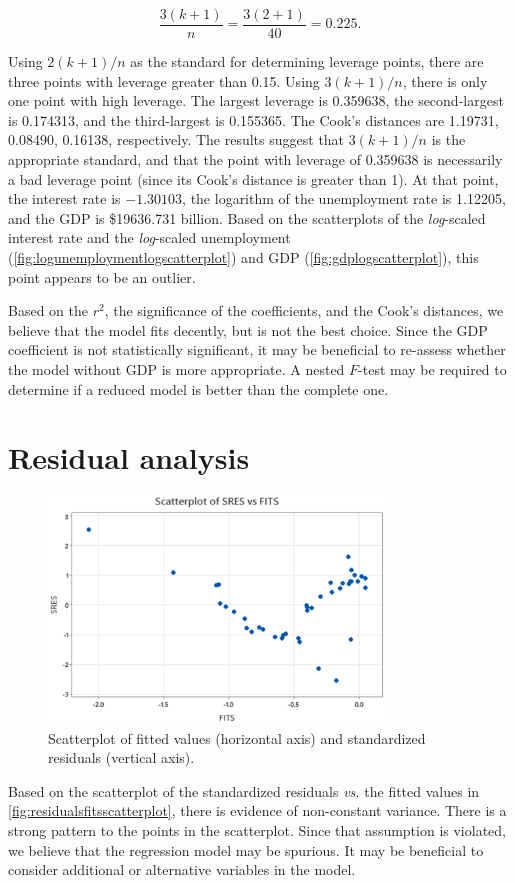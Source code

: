 \documentclass[12pt]{article}
\begin{document}
\[\frac{3(k+1)}{n}=\frac{3(2+1)}{40}=0.225.\]

Using $2(k+1)/n$ as the standard for determining leverage points, there are three points with leverage greater than 0.15. Using $3(k+1)/n$, there is only one point with high leverage. The largest leverage is 0.359638, the second-largest is 0.174313, and the third-largest is 0.155365. The Cook's distances are 1.19731, 0.08490, 0.16138, respectively. The results suggest that $3(k+1)/n$ is the appropriate standard, and that the point with leverage of 0.359638 is necessarily a bad leverage point (since its Cook's distance is greater than 1). At that point, the interest rate is $-1.30103$, the logarithm of the unemployment rate is 1.12205, and the GDP is \$19636.731 billion. Based on the scatterplots of the \textit{log}-scaled interest rate and the \textit{log}-scaled unemployment (\autoref{fig:logunemploymentlogscatterplot}) and GDP (\autoref{fig:gdplogscatterplot}), this point appears to be an outlier.

Based on the $r^2$, the significance of the coefficients, and the Cook's distances, we believe that the model fits decently, but is not the best choice. Since the GDP coefficient is not statistically significant, it may be beneficial to re-assess whether the model without GDP is more appropriate. A nested $F$-test may be required to determine if a reduced model is better than the complete one. 
\section{Residual analysis}
\begin{figure}[h]
\begin{center}
\includegraphics[width=3.5in]{images/residuals-fits-scatterplot.png}
\end{center}
\caption{Scatterplot of fitted values (horizontal axis) and standardized residuals (vertical axis). \label{fig:residualsfitsscatterplot}}
\end{figure}
Based on the scatterplot of the standardized residuals \textit{vs.} the fitted values in \autoref{fig:residualsfitsscatterplot}, there is evidence of non-constant variance. There is a strong pattern to the points in the scatterplot. Since that assumption is violated, we believe that the regression model may be spurious. It may be beneficial to consider additional or alternative variables in the model.
\end{document}
